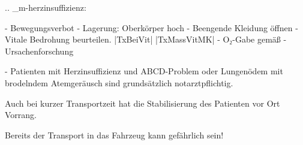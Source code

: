 

.. _m-herzinsuffizienz:


\begin{itemize}
  -   Bewegungsverbot
  -   Lagerung: Oberkörper hoch
  -   Beengende Kleidung öffnen
  -   Vitale Bedrohung beurteilen. |TxBeiVit| |TxMassVitMK|
  -   O₂-Gabe gemäß 
  -   Ursachenforschung
\end{itemize}

\begin{Danger}
  -   Patienten mit Herzinsuffizienz und ABCD-Problem oder Lungenödem mit 
  brodelndem Atemgeräusch sind grundsätzlich notarztpflichtig. 
  
  Auch bei kurzer Transportzeit hat die Stabilisierung des Patienten vor Ort Vorrang.
  
  Bereits der Transport in das Fahrzeug kann gefährlich sein!
\end{Danger}
